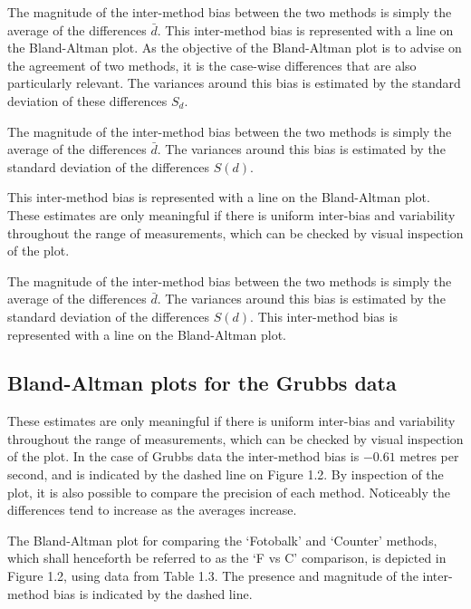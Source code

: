 \documentclass[Main.tex]{subfiles}
\begin{document}
The magnitude of the inter-method bias between the two methods is simply the average of the differences $\bar{d}$. This inter-method bias is represented with a line on the Bland-Altman plot. As the objective of the Bland-Altman plot is to advise on the agreement of two methods, it is the case-wise differences that are also particularly relevant. The variances around this bias is estimated by the standard deviation of these differences $S_{d}$.

The magnitude of the inter-method bias between the two methods is simply the average of the differences $\bar{d}$. The variances around this bias is estimated by the standard deviation of the
	differences $S(d)$. 
	
	This inter-method bias is represented with a
	line on the Bland-Altman plot. These estimates are only meaningful
	if there is uniform inter-bias and variability throughout the
	range of measurements, which can be checked by visual inspection
	of the plot. 

	The magnitude of the inter-method bias between the two methods is
	simply the average of the differences $\bar{d}$. The variances
	around this bias is estimated by the standard deviation of the
	differences $S(d)$. This inter-method bias is represented with a
	line on the Bland-Altman plot. 
	

	
	
\subsection{Bland-Altman plots for the Grubbs data}
These estimates are only meaningful if there is uniform inter-bias and variability throughout the
range of measurements, which can be checked by visual inspection of the plot. In the case of Grubbs data the inter-method bias is $-0.61$ metres per second, and is indicated by the dashed line on Figure 1.2. By inspection of the plot, it is also possible to
compare the precision of each method. Noticeably the differences tend to increase as the averages increase.


	
The Bland-Altman plot for comparing the `Fotobalk' and `Counter' methods, which shall henceforth be referred to as the `F vs C'
comparison,  is depicted in Figure 1.2, using data from Table 1.3. The presence and magnitude of the inter-method bias is indicated
	by the dashed line.

	
	
\end{document}
